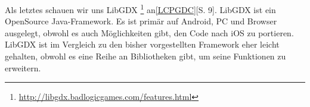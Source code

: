Als letztes schauen wir uns LibGDX \footnote{\url{http://libgdx.badlogicgames.com/features.html}} an\ref{LCPGDC}[S. 9]. LibGDX ist ein OpenSource Java-Framework. Es ist primär auf Android, PC und Browser ausgelegt, obwohl es auch Möglichkeiten gibt, den Code nach iOS zu portieren. LibGDX ist im Vergleich zu den bisher vorgestellten Framework eher leicht gehalten, obwohl es eine Reihe an Bibliotheken gibt, um seine Funktionen zu erweitern.